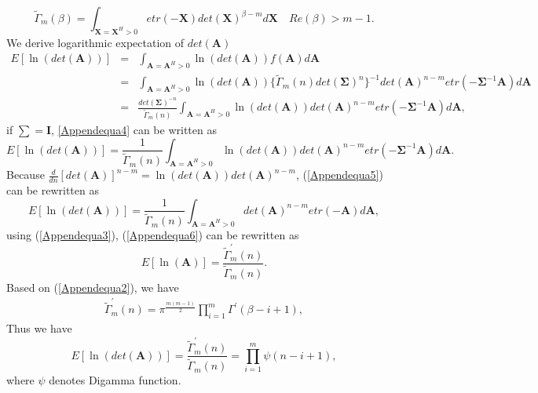 \documentclass[12pt,letter,final]{article}
\begin{document}
\begin{spacing}{2.5}
\begin{appendices}
\begin{equation}
\tilde{\Gamma}_{m}(\beta)=\int_{\mathbf{X}=\mathbf{X}^{H}>0}etr(-\mathbf{X})det(\mathbf{X})^{\beta-m}d
\mathbf{X} \quad Re(\beta)>m-1.
\label{Appendequa3}
\end{equation}
We derive logarithmic expectation of $det(\mathbf{A})$
\begin{eqnarray}
\nonumber
E[\ln(det(\mathbf{A}))]&=&\int_{\mathbf{A}=\mathbf{A}^{H}>0}\ln(det(\mathbf{A}))f(\mathbf{A})d\mathbf{A}\\
\nonumber
&=&\int_{\mathbf{A}=\mathbf{A}^{H}>0}\ln(det(\mathbf{A}))\{\tilde{\Gamma}_{m}(n)det(\mathbf{\Sigma})^{n} \}^{-1}det(\mathbf{A})^{n-m}etr(-\mathbf{\Sigma}^{-1}\mathbf{A})d\mathbf{A}\\
\nonumber
&=&\frac{det(\mathbf{\Sigma})^{-n}}{\tilde{\Gamma}_{m}(n)}\int_{\mathbf{A}=\mathbf{A}^{H}>0}\ln(det(\mathbf{A}))det(\mathbf{A})^{n-m}etr(-\mathbf{\Sigma}^{-1}\mathbf{A})d\mathbf{A},
\label{Appendequa4}
\end{eqnarray}
if $\mathbf{\sum}=\mathbf{I}$, \ref{Appendequa4} can be written as 
\begin{equation}
E[\ln(det(\mathbf{A}))]=\frac{1}{\tilde{\Gamma}_{m}(n)}\int_{\mathbf{A}=\mathbf{A}^{H}>0}\ln(det(\mathbf{A}))det(\mathbf{A})^{n-m}etr(-\mathbf{\Sigma}^{-1}\mathbf{A})d\mathbf{A}.
\label{Appendequa5}
\end{equation}
Because $\frac{d}{dn}[det(\mathbf{A})]^{n-m}=\ln(det(\mathbf{A}))det(\mathbf{A})^{n-m}$, (\ref{Appendequa5}) can be rewritten as
\begin{equation}
E[\ln(det(\mathbf{A}))]=\frac{1}{\tilde{\Gamma}_{m}(n)}\int_{\mathbf{A}=\mathbf{A}^{H}>0}det(\mathbf{A})^{n-m}etr(-\mathbf{A})d\mathbf{A},
\label{Appendequa6}
\end{equation}
using (\ref{Appendequa3}), (\ref{Appendequa6}) can be rewritten as 
\begin{equation}
E[\ln(\mathbf{A})]=\frac{\tilde{\Gamma}^{'}_{m}(n)}{\tilde{\Gamma}_{m}(n)}.
\label{Appendequa7}
\end{equation}
Based on (\ref{Appendequa2}), we have 
\begin{eqnarray}
\tilde{\Gamma}^{'}_{m}(n)=\pi^{\frac{m(m-1)}{2}}\prod_{i=1}^{m}\Gamma^{'}(\beta-i+1),
\end{eqnarray}
Thus we have 
\begin{equation}
E[\ln(det(\mathbf{A}))]=\frac{\tilde{\Gamma}^{'}_{m}(n)}{\tilde{\Gamma}_{m}(n)}=\prod_{i=1}^{m}\psi(n-i+1),
\label{Appendequa8}
\end{equation}
where $\psi$ denotes Digamma function.

\end{appendices}
\end{spacing}
\end{document}
